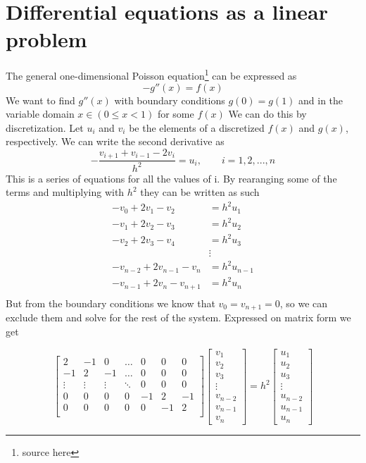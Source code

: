 \documentclass[10pt,a4paper]{article}
\begin{document}
    \section{Differential equations as a linear problem}
    The general one-dimensional Poisson equation\footnote{source here} can be expressed as
    \[
    -g''(x) = f(x)
    \]
    We want to find $g''(x)$ with boundary conditions $g(0) = g(1)$ and in the variable domain $x\in (0\leq x<1)$ for some $f(x)$
    We can do this by discretization. Let $u_i$ and $v_i$ be the elements of a discretized $f(x)$ and $g(x)$, respectively. We can write the second derivative as
    $$-\frac{v_{i+1}+v_{i-1}-2v_i}{h^2} = u_i, \qquad i = 1,2,...,n$$
    This is a series of equations for all the values of i. By rearanging some of the terms and multiplying with $h^2$ they can be written as such
    \begin{align*}
        -v_0 + 2v_1 - v_2 &= h^2u_1\\
        -v_1 + 2v_2 - v_3 &= h^2u_2\\
        -v_2 + 2v_3 - v_4 &= h^2u_3\\
        &\vdots\\
        -v_{n-2} + 2v_{n-1} - v_{n} &= h^2u_{n-1}\\
        -v_{n-1} + 2v_{n} - v_{n+1} &= h^2u_{n}\\
    \end{align*}
    But from the boundary conditions we know that $v_0 = v_{n+1} = 0$, so we can exclude them and solve for the rest of the system. Expressed on matrix form we get
    
    \begin{equation}\label{special matrix}
    \begin{bmatrix}
    2 & -1 & 0 & \dots & 0 & 0 & 0 \\
    -1 & 2 & -1 & \dots & 0 & 0 & 0 \\
    \vdots & \vdots & \vdots & \ddots & 0 & 0 & 0 \\
    0 & 0 & 0 & 0 & -1 & 2 & -1\\
    0 & 0 & 0 & 0 & 0 & -1 & 2 \\
    \end{bmatrix}
    \begin{bmatrix}
        v_1\\ v_2 \\ v_3 \\ \vdots \\ v_{n-2} \\v_{n-1} \\ v_{n}
    \end{bmatrix}
    =h^2
    \begin{bmatrix}
        u_1 \\ u_2 \\ u_3 \\ \vdots \\ u_{n-2} \\ u_{n-1} \\ u_{n}
    \end{bmatrix}
    \end{equation}
\end{document}
